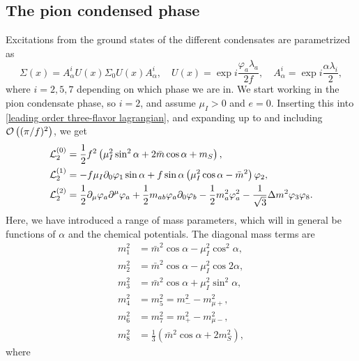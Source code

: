 \subsection{The pion condensed phase}

Excitations from the ground states of the different condensates are parametrized as
%
\begin{equation}
    \Sigma(x) = A^i_\alpha U(x) \Sigma_0 U(x) A^i_\alpha, \quad
    U(x) = \exp{i \frac{\varphi_a \lambda_a}{2 f}}, \quad
    A_\alpha^i = \exp{i \frac{\alpha \lambda_i}{2}},
\end{equation}
%
where $i = 2, 5, 7$ depending on which phase we are in.
We start working in the pion condensate phase, so $i = 2$, and assume $\mu_I > 0$ and $e = 0$.
Inserting this into \autoref{leading order three-flavor lagrangian}, and expanding up to and including $\mathcal O\left((\pi/f)^2\right)$, we get
%
\begin{align}
    \label{static three-flavor lagrangian}
    \mathcal{L}_2^{(0)} 
    &=
    \frac{1}{2} f^2
    \left(
        \mu_I^2 \sin^2\alpha
        + 2\bar m \cos\alpha
        + m_S
    \right), \\
    \label{linear three-flavor lagrangian}
    \mathcal{L}_2^{(1)}
    &=
    -f \mu_I \partial_0 \varphi_1 \sin\alpha
    + f \sin\alpha
    \left(
        \mu_I^2\cos\alpha - \bar m^2
    \right)\varphi_2, \\
    \label{quadratic three-flavor lagrangian}
    \mathcal{L}_2^{(2)} 
    &= 
    \frac{1}{2}\partial_\mu \varphi_a \partial^\mu \varphi_a
    + \frac{1}{2} m_{ab} \varphi_a\partial_0\varphi_b
    - \frac{1}{2} m_a^2 \varphi_a^2
    - \frac{1}{\sqrt{3}} \Delta m^2 \varphi_3 \varphi_8.
\end{align}
%
Here, we have introduced a range of mass parameters, which will in general be functions of $\alpha$ and the chemical potentials.
The diagonal mass terms are
%
\begingroup
\allowdisplaybreaks
\begin{align}
    m_1^2 &=  \bar m^2\cos\alpha - \mu_I^2 \cos^2\alpha,\\
    m_2^2 &= \bar m^2\cos\alpha - \mu_I^2 \cos2\alpha, \\
    m_3^2 &= \bar m^2\cos\alpha + \mu_I^2 \sin^2\alpha, \\
    m_4^2 &= m_5^2 = m_-^2 - m_{\mu+}^2, \\
    m_6^2 &= m_7^2 = m_+^2 - m^2_{\mu-}, \\
    m_8^2 &= \frac{1}{3} (\bar m^2 \cos\alpha + 2 m_S^2),
\end{align}
\endgroup
%
where
